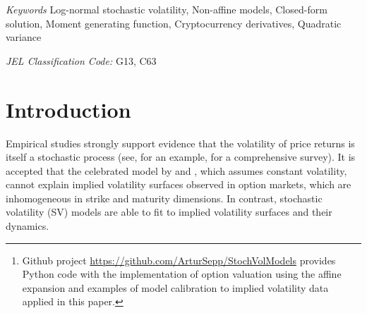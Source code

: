 \documentclass[11pt,a4paper] {article}
\begin{document}
\begin{abstract}
We introduce the log-normal stochastic volatility (SV) model with a quadratic drift to allow arbitrage-free valuation of options on assets under money-market account and inverse martingale measures. We show that the proposed volatility process has the unique strong solution, despite non-Lipschitz quadratic drift, and we establish the corresponding Feynman-Kac partial differential equation (PDE) for computation of conditional expectations under this SV model. We derive conditions for arbitrage-free valuations when return-volatility correlation is positive to preclude the ``loss of martingality'', which occurs in many traditional SV models. Importantly, we develop an analytic approach to compute an affine expansion for the moment generating function of the log-price, its quadratic variance (QV) and the instantaneous volatility. Our solution allows for semi-analytic valuation of vanilla options under log-normal SV models closing a gap in existing studies.

We apply our approach for solving the joint valuation problem of vanilla and inverse options, which are popular in the cryptocurrency option markets. We demonstrate the accuracy of our solution for valuation of vanilla and inverse options\footnote{Github project \url{https://github.com/ArturSepp/StochVolModels} provides Python code with the implementation of option valuation using the affine expansion and examples of model calibration to implied volatility data applied in this paper.}. By calibrating the model to time series of options on Bitcoin over the past four years, we show that the log-normal SV model can work efficiently in different market regimes. Our model can be well applied for modeling of implied volatilities of assets with positive return-volatility correlation.
\end{abstract}

\textit{Keywords} Log-normal stochastic volatility, Non-affine models, Closed-form solution, Moment generating function, Cryptocurrency derivatives, Quadratic variance


\textit{JEL Classification Code:} G13, C63



\section{Introduction}


Empirical studies strongly support evidence that the volatility of price returns is itself a stochastic process (see, for an example, \cite{Shephard2005} for a comprehensive survey). It is accepted that the celebrated model by \cite{BS73} and \cite{Merton73}, which assumes constant volatility, cannot explain implied volatility surfaces observed in option markets, which are inhomogeneous in strike and maturity dimensions. In contrast, stochastic volatility (SV) models are able to fit to implied volatility surfaces and their dynamics. 
\end{document}
